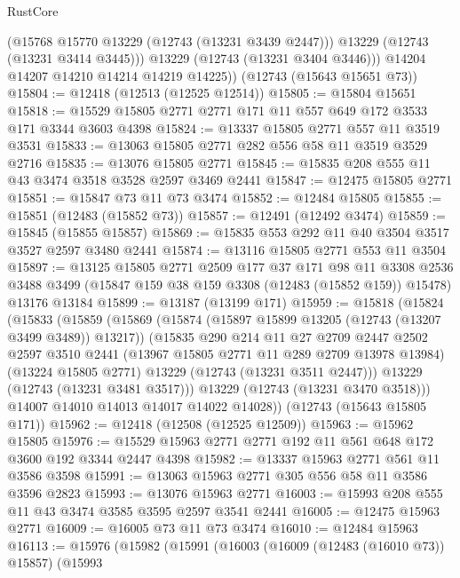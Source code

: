 \begin{lexlean}{RustCore}
\begin{coremodule}
            (@15768 @15770 @13229 (@12743 (@13231 @3439 @2447)))
            @13229
            (@12743 (@13231 @3414 @3445)))
          @13229
          (@12743 (@13231 @3404 @3446)))
        @14204
        @14207
        @14210
        @14214
        @14219
        @14225))
    (@12743 (@15643 @15651 @73))
@15804 := @12418 (@12513 (@12525 @12514))
@15805 := @15804 @15651
@15818 := @15529 @15805 @2771 @2771 @171 @11 @557 @649 @172 @3533 @171 @3344 @3603 @4398
@15824 := @13337 @15805 @2771 @557 @11 @3519 @3531
@15833 := @13063 @15805 @2771 @282 @556 @58 @11 @3519 @3529 @2716
@15835 := @13076 @15805 @2771
@15845 := @15835 @208 @555 @11 @43 @3474 @3518 @3528 @2597 @3469 @2441
@15847 := @12475 @15805 @2771
@15851 := @15847 @73 @11 @73 @3474
@15852 := @12484 @15805
@15855 := @15851 (@12483 (@15852 @73))
@15857 := @12491 (@12492 @3474)
@15859 := @15845 (@15855 @15857)
@15869 := @15835 @553 @292 @11 @40 @3504 @3517 @3527 @2597 @3480 @2441
@15874 := @13116 @15805 @2771 @553 @11 @3504
@15897 := @13125
    @15805
    @2771
    @2509
    @177
    @37
    @171
    @98
    @11
    @3308
    @2536
    @3488
    @3499
    (@15847 @159 @38 @159 @3308 (@12483 (@15852 @159)) @15478)
    @13176
    @13184
@15899 := @13187 (@13199 @171)
@15959 := @15818
    (@15824
      (@15833
        (@15859
          (@15869
            (@15874 (@15897 @15899 @13205 (@12743 (@13207 @3499 @3489)) @13217))
            (@15835
              @290
              @214
              @11
              @27
              @2709
              @2447
              @2502
              @2597
              @3510
              @2441
              (@13967 @15805 @2771 @11 @289 @2709 @13978 @13984)
              (@13224 @15805 @2771)
              @13229
              (@12743 (@13231 @3511 @2447)))
            @13229
            (@12743 (@13231 @3481 @3517)))
          @13229
          (@12743 (@13231 @3470 @3518)))
        @14007
        @14010
        @14013
        @14017
        @14022
        @14028))
    (@12743 (@15643 @15805 @171))
@15962 := @12418 (@12508 (@12525 @12509))
@15963 := @15962 @15805
@15976 := @15529 @15963 @2771 @2771 @192 @11 @561 @648 @172 @3600 @192 @3344 @2447 @4398
@15982 := @13337 @15963 @2771 @561 @11 @3586 @3598
@15991 := @13063 @15963 @2771 @305 @556 @58 @11 @3586 @3596 @2823
@15993 := @13076 @15963 @2771
@16003 := @15993 @208 @555 @11 @43 @3474 @3585 @3595 @2597 @3541 @2441
@16005 := @12475 @15963 @2771
@16009 := @16005 @73 @11 @73 @3474
@16010 := @12484 @15963
@16113 := @15976
    (@15982
      (@15991
        (@16003
          (@16009 (@12483 (@16010 @73)) @15857)
          (@15993

\end{coremodule}
\end{lexlean}
